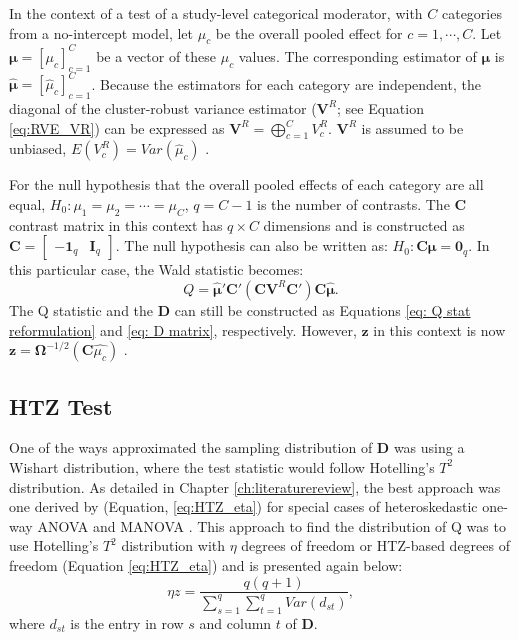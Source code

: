 In the context of a test of a study-level categorical moderator, with $C$ categories from a no-intercept model, let $\mu_c$ be the overall pooled effect for $c=1,\cdots, C$. Let $\bm{\mu} = \left[\mu_c\right]_{c=1}^C$ be a vector of these $\mu_c$ values. The corresponding estimator of $\bm{\mu}$  is $\bm{\hat{\mu}} = \left[\hat{\mu}_c\right]_{c=1}^C$. Because the estimators for each category are independent, the diagonal of the cluster-robust variance estimator ($\bm{V}^R$; see Equation \ref{eq:RVE_VR}) can be expressed as $\bm{V}^R = \bigoplus_{c=1}^C V^R_c$.
$\bm{V}^R$ is assumed to be unbiased, $E(V_c^R) = Var(\hat{\mu}_c)$ \autocite{pustejovsky_wald_2025}.

For the null hypothesis that the overall pooled effects of each category are all equal,  $H_0: \mu_1 = \mu_2 = \cdots = \mu_C$,  $q=C-1$ is the number of contrasts. The $\mathbf{C}$ contrast matrix in this context has $q \times C$ dimensions and is constructed as $\mathbf{C} = \begin{bmatrix}
    -\mathbf{1}_q & \mathbf{I}_q
\end{bmatrix}$.  The null hypothesis can also be written as: $H_0:\mathbf{C}\bm{\mu} = \bm{0}_q$. In this particular case, the Wald statistic becomes:
\begin{equation}
    Q = \hat{\bm{\mu}}'\mathbf{C}'(\mathbf{C} \mathbf{V}^R \mathbf{C}') \mathbf{C}\hat{\bm{\mu}}.
    \nonumber
\end{equation}
The Q statistic and the $\mathbf{D}$ can still be constructed as Equations \ref{eq: Q stat reformulation} and \ref{eq: D matrix}, respectively. However, $\mathbf{z}$ in this context is now $\mathbf{z} = \mathbf{\Omega}^{-1/2}(\mathbf{C}\hat{\mu_c})$ \autocite{pustejovsky_wald_2025}.


\subsection{HTZ Test}

One of the ways \textcite{tipton2015b} approximated the sampling distribution of $\mathbf{D}$ was using a Wishart distribution, where the test statistic would follow Hotelling's $T^2$ distribution. As detailed in Chapter \ref{ch:literaturereview}, the best approach was one derived by \textcite{zhang2012, zhang2013}(Equation, \ref{eq:HTZ_eta}) for special cases of heteroskedastic one-way ANOVA and MANOVA \autocite{tipton2015b}.  This approach to find the distribution of Q was to use Hotelling's $T^2$ distribution with $\eta$ degrees of freedom or HTZ-based degrees of freedom (Equation \ref{eq:HTZ_eta}) and is presented again below:
\begin{equation}
    \eta z = \frac{q(q+1)}{\sum_{s=1}^q \sum_{t=1}^q Var(d_{st})},
    \nonumber
\end{equation}
where $d_{st}$ is the entry in row $s$ and column $t$ of $\bm{D}$.

